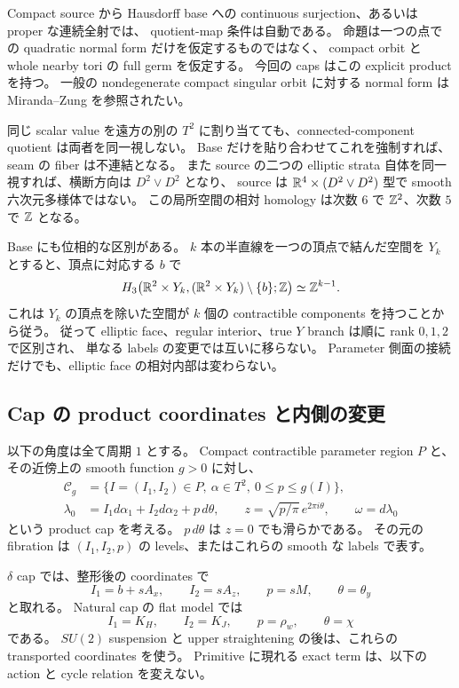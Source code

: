 Compact source から Hausdorff base への continuous surjection、あるいは proper な連続全射では、
quotient-map 条件は自動である。
命題は一つの点での quadratic normal form だけを仮定するものではなく、
compact orbit と whole nearby tori の full germ を仮定する。
今回の caps はこの explicit product を持つ。
一般の nondegenerate compact singular orbit に対する normal form は
Miranda--Zung \cite[Theorem 2.1]{miranda-local} を参照されたい。

同じ scalar value を遠方の別の $T^2$ に割り当てても、connected-component quotient は両者を同一視しない。
Base だけを貼り合わせてこれを強制すれば、seam の fiber は不連結となる。
また source の二つの elliptic strata 自体を同一視すれば、横断方向は $D^2\vee D^2$ となり、
source は $\mathbb R^4\times(D^2\vee D^2)$ 型で smooth 六次元多様体ではない。
この局所空間の相対 homology は次数 $6$ で $\mathbb Z^2$、次数 $5$ で $\mathbb Z$ となる。

Base にも位相的な区別がある。
$k$ 本の半直線を一つの頂点で結んだ空間を $Y_k$ とすると、頂点に対応する $b$ で
\[
 H_3\bigl(\mathbb R^2\times Y_k,
       (\mathbb R^2\times Y_k)\setminus\{b\};\mathbb Z\bigr)
   \simeq\mathbb Z^{k-1}.
\]
これは $Y_k$ の頂点を除いた空間が $k$ 個の contractible components を持つことから従う。
従って elliptic face、regular interior、true $Y$ branch は順に rank $0,1,2$ で区別され、
単なる labels の変更では互いに移らない。
Parameter 側面の接続だけでも、elliptic face の相対内部は変わらない。

\subsection{Cap の product coordinates と内側の変更}

以下の角度は全て周期 $1$ とする。
Compact contractible parameter region $P$ と、その近傍上の smooth function $g>0$ に対し、
\begin{equation}\label{eb:product-cap}
 \begin{split}
 \mathcal C_g
   &=\{I=(I_1,I_2)\in P,\ \alpha\in T^2,\ 0\le p\le g(I)\},\\
 \lambda_0&=I_1d\alpha_1+I_2d\alpha_2+p\,d\theta,
 \qquad z=\sqrt{p/\pi}\,e^{2\pi i\theta},\qquad \omega=d\lambda_0
 \end{split}
\end{equation}
という product cap を考える。
$p\,d\theta$ は $z=0$ でも滑らかである。
その元の fibration は $(I_1,I_2,p)$ の levels、またはこれらの smooth な labels で表す。

$\delta$ cap では、整形後の coordinates で
\[
 I_1=b+sA_x,\qquad I_2=sA_z,\qquad p=sM,\qquad \theta=\theta_y
\]
と取れる。
Natural cap の flat model では
\[
 I_1=K_H,\qquad I_2=K_J,\qquad p=\rho_w,\qquad \theta=\chi
\]
である。
$SU(2)$ suspension と upper straightening の後は、これらの transported coordinates を使う。
Primitive に現れる exact term は、以下の action と cycle relation を変えない。

